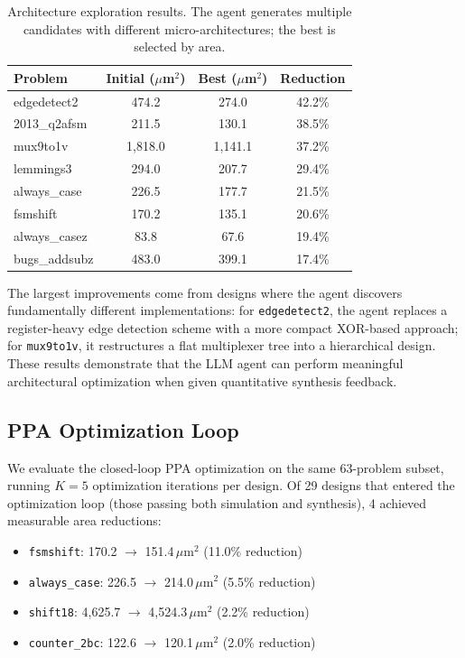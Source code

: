 \begin{table}[t]
\centering
\caption{Architecture exploration results. The agent generates multiple candidates with different micro-architectures; the best is selected by area.}
\label{tab:arch_explore}
\small
\begin{tabular}{lccc}
\toprule
\textbf{Problem} & \textbf{Initial ($\mu$m$^2$)} & \textbf{Best ($\mu$m$^2$)} & \textbf{Reduction} \\
\midrule
edgedetect2 & 474.2 & 274.0 & 42.2\% \\
2013\_q2afsm & 211.5 & 130.1 & 38.5\% \\
mux9to1v & 1{,}818.0 & 1{,}141.1 & 37.2\% \\
lemmings3 & 294.0 & 207.7 & 29.4\% \\
always\_case & 226.5 & 177.7 & 21.5\% \\
fsmshift & 170.2 & 135.1 & 20.6\% \\
always\_casez & 83.8 & 67.6 & 19.4\% \\
bugs\_addsubz & 483.0 & 399.1 & 17.4\% \\
\bottomrule
\end{tabular}
\end{table}

The largest improvements come from designs where the agent discovers fundamentally different implementations: for \texttt{edgedetect2}, the agent replaces a register-heavy edge detection scheme with a more compact XOR-based approach; for \texttt{mux9to1v}, it restructures a flat multiplexer tree into a hierarchical design. These results demonstrate that the LLM agent can perform meaningful architectural optimization when given quantitative synthesis feedback.

\subsection{PPA Optimization Loop}
\label{sec:ppa_opt_results}

We evaluate the closed-loop PPA optimization on the same 63-problem subset, running $K{=}5$ optimization iterations per design. Of 29 designs that entered the optimization loop (those passing both simulation and synthesis), 4 achieved measurable area reductions:

\begin{itemize}[leftmargin=*,itemsep=1pt,topsep=2pt]
    \item \texttt{fsmshift}: 170.2 $\to$ 151.4\,$\mu$m$^2$ (11.0\% reduction)
    \item \texttt{always\_case}: 226.5 $\to$ 214.0\,$\mu$m$^2$ (5.5\% reduction)
    \item \texttt{shift18}: 4{,}625.7 $\to$ 4{,}524.3\,$\mu$m$^2$ (2.2\% reduction)
    \item \texttt{counter\_2bc}: 122.6 $\to$ 120.1\,$\mu$m$^2$ (2.0\% reduction)
\end{itemize}

